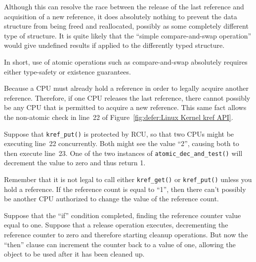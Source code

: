 	Although this can resolve the race between the release of
	the last reference and acquisition of a new reference,
	it does absolutely nothing to prevent the data structure
	from being freed and reallocated, possibly as some completely
	different type of structure.
	It is quite likely that the ``simple compare-and-swap
	operation'' would give undefined results if applied to the
	differently typed structure.

	In short, use of atomic operations such as compare-and-swap
	absolutely requires either type-safety or existence guarantees.


	  Because a CPU must already hold a reference in order
	  to legally acquire another reference.
	  Therefore, if one CPU releases the last reference,
	  there cannot possibly be any CPU that is permitted
	  to acquire a new reference.
	  This same fact allows the non-atomic check in line~22
	  of Figure~\ref{fig:defer:Linux Kernel kref API}.


	  Suppose that {\tt kref\_put()} is protected by RCU, so
	  that two CPUs might be executing line~22 concurrently.
	  Both might see the value ``2'', causing both to then
	  execute line~23.
	  One of the two instances of {\tt atomic\_dec\_and\_test()}
	  will decrement the value to zero and thus return 1.


	  Remember that it is not legal to call either {\tt kref\_get()}
	  or {\tt kref\_put()} unless you hold a reference.
	  If the reference count is equal to ``1'', then there
	  can't possibly be another CPU authorized to change the
	  value of the reference count.


	  Suppose that the ``if'' condition completed, finding
	  the reference counter value equal to one.
	  Suppose that a release operation executes, decrementing
	  the reference counter to zero and therefore starting
	  cleanup operations.
	  But now the ``then'' clause can increment the counter
	  back to a value of one, allowing the object to be
	  used after it has been cleaned up.

